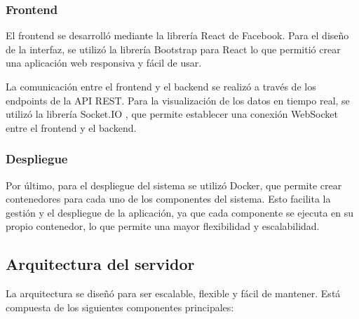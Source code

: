 \subsubsection{Frontend}

El frontend se desarrolló mediante la librería React de Facebook. Para el
diseño de la interfaz, se utilizó la librería Bootstrap para React
\cite{ReactBootstrap} lo que permitió crear una aplicación web responsiva y
fácil de usar.

La comunicación entre el frontend y el backend se realizó a través de los
endpoints de la API REST. Para la visualización de los datos en tiempo real, se
utilizó la librería Socket.IO \cite{SocketIO}, que permite establecer una
conexión WebSocket entre el frontend y el backend.

\subsubsection{Despliegue}

Por último, para el despliegue del sistema se utilizó Docker, que permite crear
contenedores para cada uno de los componentes del sistema. Esto facilita la
gestión y el despliegue de la aplicación, ya que cada componente se ejecuta en
su propio contenedor, lo que permite una mayor flexibilidad y escalabilidad.


\subsection{Arquitectura del servidor}

La arquitectura se diseñó para ser escalable, flexible y fácil de mantener.
Está compuesta de los siguientes componentes principales:

